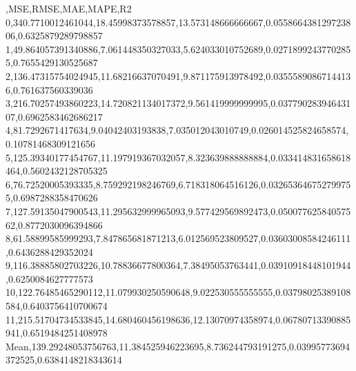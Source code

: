,MSE,RMSE,MAE,MAPE,R2
0,340.7710012461044,18.45998373578857,13.573148666666667,0.055866438129723806,0.6325879289798857
1,49.864057391340886,7.061448350327033,5.624033010752689,0.02718992437702855,0.7655429130525687
2,136.47315754024945,11.68216637070491,9.871175913978492,0.03555890867144136,0.761637560339036
3,216.70257493860223,14.720821134017372,9.561419999999995,0.03779028394643107,0.6962583462686217
4,81.7292671417634,9.04042403193838,7.035012043010749,0.026014525824658574,0.10781468309121656
5,125.39340177454767,11.197919367032057,8.323639888888884,0.033414831658618464,0.5602432128705325
6,76.72520005393335,8.759292198246769,6.718318064516126,0.032653646752799755,0.6987288358470626
7,127.59135047900543,11.295632999965093,9.577429569892473,0.05007762584057562,0.8772030096394866
8,61.58899585999293,7.847865681871213,6.012569523809527,0.03603008584246111,0.6436288429352024
9,116.38885802703226,10.78836677800364,7.38495053763441,0.03910918448101944,0.6250084627777573
10,122.76485465290112,11.079930250590648,9.022530555555555,0.03798025389108584,0.6403756410700674
11,215.51704734533845,14.680460456198636,12.13070974358974,0.06780713390885941,0.6519484251408978
Mean,139.29248053756763,11.384525946223695,8.736244793191275,0.03995773694372525,0.6384148218343614
